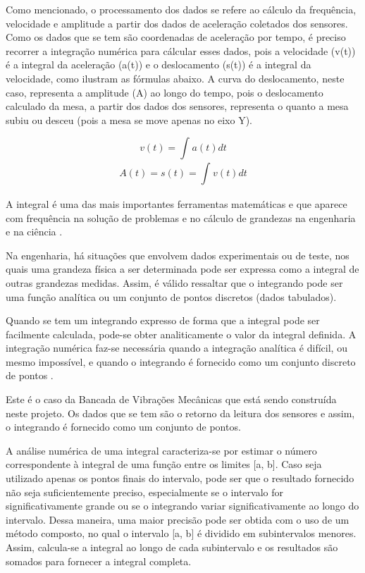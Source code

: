 Como mencionado, o processamento dos dados se refere ao cálculo da frequência, velocidade e amplitude a partir dos dados de aceleração
coletados dos sensores. Como os dados que se tem são coordenadas de aceleração por tempo, é preciso recorrer a integração numérica para 
cálcular esses dados, pois a velocidade (v(t)) é a integral da aceleração (a(t)) e o deslocamento (s(t)) é a integral da velocidade, como 
ilustram as fórmulas abaixo. A curva do deslocamento, neste caso, representa a amplitude (A) ao longo do tempo, pois o deslocamento calculado
da mesa, a partir dos dados dos sensores, representa o quanto a mesa subiu ou desceu (pois a mesa se move apenas no eixo Y).

$$ v(t) = \int_{}^{} a(t) dt$$
$$ A(t) = s(t) = \int_{}^{} v(t) dt$$


A integral é uma das mais importantes ferramentas matemáticas e que aparece com frequência na solução de problemas e no cálculo de grandezas 
na engenharia e na ciência \cite{metodos_numericos}.

Na engenharia, há situações que envolvem dados experimentais ou de teste, nos quais uma grandeza física a ser determinada pode ser expressa 
como a integral de outras grandezas medidas. Assim, é válido ressaltar que o integrando pode ser uma função analítica ou um conjunto de pontos
discretos (dados tabulados).

Quando se tem um integrando expresso de forma que a integral pode ser facilmente calculada, pode-se obter analiticamente o valor da integral 
definida. A integração numérica faz-se necessária quando a integração analítica é difícil, ou mesmo impossível, e quando o integrando é fornecido
como um conjunto discreto de pontos \cite{metodos_numericos}.

Este é o caso da Bancada de Vibrações Mecânicas que está sendo construída neste projeto. Os dados que se tem são o retorno da leitura dos sensores 
e assim, o integrando é fornecido como um conjunto de pontos.

A análise numérica de uma integral caracteriza-se por estimar o número correspondente à integral de uma função entre os limites [a, b]. 
Caso seja utilizado apenas os pontos finais do intervalo, pode ser que o resultado fornecido não seja suficientemente preciso, especialmente se
o intervalo for significativamente grande ou se o integrando variar significativamente ao longo do intervalo. Dessa maneira, uma maior precisão 
pode ser obtida com o uso de um método composto, no qual o intervalo [a, b] é dividido em subintervalos menores. Assim, calcula-se a integral ao
longo de cada subintervalo e os resultados são somados para fornecer a integral completa.

